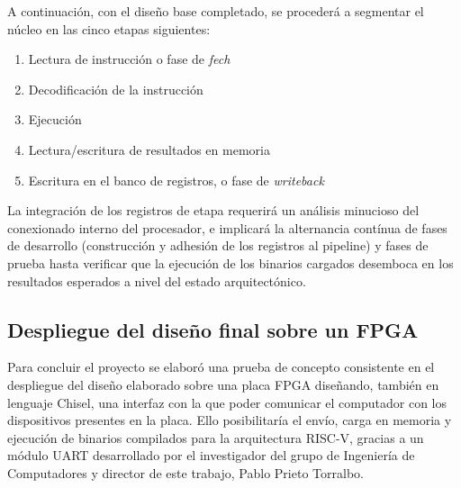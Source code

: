 A continuación, con el diseño base completado, se procederá a segmentar el núcleo en las cinco etapas siguientes:

\begin{enumerate}
  \item{Lectura de instrucción o fase de \textit{fech}}
  \vspace{-0.2cm}
  \item{Decodificación de la instrucción}
  \vspace{-0.2cm}
  \item{Ejecución}
  \vspace{-0.2cm}
  \item{Lectura/escritura de resultados en memoria}
  \vspace{-0.2cm}
  \item{Escritura en el banco de registros, o fase de \textit{writeback}}
\end{enumerate}

La integración de los registros de etapa requerirá un análisis minucioso del conexionado interno del procesador, e implicará la alternancia contínua de fases de desarrollo (construcción y adhesión de los registros al pipeline) y fases de prueba hasta verificar que la ejecución de los binarios cargados desemboca en los resultados esperados a nivel del estado arquitectónico.

\subsection{Despliegue del diseño final sobre un FPGA}

Para concluir el proyecto se elaboró una prueba de concepto consistente en el despliegue del diseño elaborado sobre una placa FPGA diseñando, también en lenguaje Chisel, una interfaz con la que poder comunicar el computador con los dispositivos presentes en la placa. Ello posibilitaría el envío, carga en memoria y ejecución de binarios compilados para la arquitectura RISC-V, gracias a un módulo UART desarrollado por el investigador del grupo de Ingeniería de Computadores y director de este trabajo, Pablo Prieto Torralbo.
